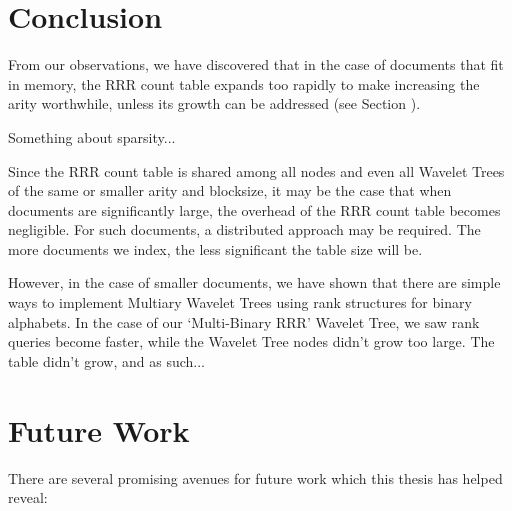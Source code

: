 \section{Conclusion}
\label{sec:conclusion}

From our observations, we have discovered that in the case of documents that fit 
in memory, the RRR count table expands too rapidly to make increasing the arity 
worthwhile, unless its growth can be addressed (see Section \label{sec:future}).

Something about sparsity...

Since the RRR count table is shared among all nodes and even all Wavelet Trees
of the same or smaller arity and blocksize, it may be the case that when 
documents are significantly large, the overhead of the RRR count table becomes 
negligible. For such documents, a distributed approach may be required. The more 
documents we index, the less significant the table size will be.

However, in the case of smaller documents, we have shown that there are simple 
ways to implement Multiary Wavelet Trees using rank structures for binary 
alphabets. In the case of our `Multi-Binary RRR' Wavelet Tree, we saw rank 
queries become faster, while the Wavelet Tree nodes didn't grow too large. The 
table didn't grow, and as such...

\section{Future Work}
\label{sec:future}
There are several promising avenues for future work which this thesis has helped
reveal:

